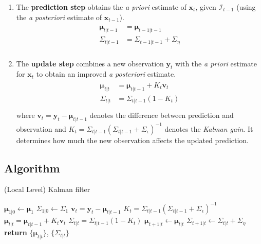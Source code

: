 \documentclass[11pt, oneside]{scrreprt}   	%
\begin{document}
\begin{enumerate}
	\item The \textbf{prediction step} obtains the \textit{a priori} estimate of $\boldsymbol{x}_t$, given $\mathcal{I}_{t-1}$ (using the \textit{a posteriori} estimate of $\boldsymbol{x}_{t-1}$).
		\begin{align*} 
		\begin{split}
		\boldsymbol{\mu}_{t | t-1} &= \boldsymbol{\mu}_{t-1 | t-1}\\
		\Sigma_{t | t-1} &= \Sigma_{t-1 | t-1} + \Sigma_{\eta}\\
		\end{split}					
		\end{align*} 
	\item The \textbf{update step} combines a new observation $\boldsymbol{y}_t$ with the \textit{a priori} estimate for $\boldsymbol{x}_t$ to obtain an improved \textit{a posteriori} estimate. 
		\begin{align*} 
		\begin{split}
		\boldsymbol{\mu}_{t | t} &= \boldsymbol{\mu}_{t | t-1} + K_t \boldsymbol{v}_t\\
		\Sigma_{t | t} &= \Sigma_{t | t-1}(1 - K_t)\\
		\end{split}					
		\end{align*} 
		where $\boldsymbol{v}_t = \boldsymbol{y}_t - \boldsymbol{\mu}_{t | t-1}$ denotes the difference between prediction and observation and $K_t = \Sigma_{t | t-1} (\Sigma_{t | t-1} + \Sigma_{\epsilon})^{-1}$ denotes the \textit{Kalman gain}. It determines how much the new observation affects the updated prediction.	
\end{enumerate}

\subsection{Algorithm}
\begin{algorithm}[h!]
\caption{(Local Level) Kalman filter}
\label{alg:kalman}
  \begin{algorithmic}[1]
      \smallskip
      \State $\boldsymbol{\mu}_{1 | 0}\gets \boldsymbol{\mu}_1$
      \State $\Sigma_{1 | 0}\gets \Sigma_1$
      \smallskip
      	\State $\boldsymbol{v}_t = \boldsymbol{y}_t - \boldsymbol{\mu}_{t | t-1}$
      	\State $K_t = \Sigma_{t | t-1} (\Sigma_{t | t-1} + \Sigma_{\epsilon})^{-1}$
	\smallskip
      	\State $\boldsymbol{\mu}_{t | t} = \boldsymbol{\mu}_{t | t-1} + K_t \boldsymbol{v}_t$
      	\State $\Sigma_{t | t} = \Sigma_{t | t-1}(1 - K_t)$
	\smallskip
      	\State $\boldsymbol{\mu}_{t+1 | t}\gets \boldsymbol{\mu}_{t | t}$
      	\State $\Sigma_{t+1 | t}\gets \Sigma_{t | t} + \Sigma_{\eta}$
      \EndFor
      \State \textbf{return} $\{\boldsymbol{\mu}_{t | t}\}$, $\{\Sigma_{t | t}\}$
    \EndProcedure
  \end{algorithmic}
\end{algorithm}
\end{document}

